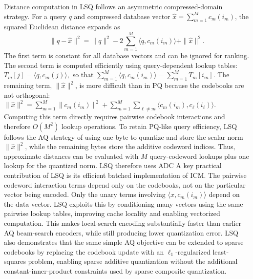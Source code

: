 \documentclass[sigconf]{acmart}
\begin{document}
Distance computation in LSQ follows an asymmetric compressed-domain strategy. 
For a query $q$ and compressed database vector $\hat{x}=\sum_{m=1}^{M}c_m(i_m)$, the squared Euclidean distance expands as
\[
\|q-\hat{x}\|^2
=
\|q\|^2
-
2\sum_{m=1}^{M}\langle q,c_m(i_m)\rangle
+
\|\hat{x}\|^2 .
\]
The first term is constant for all database vectors and can be ignored for ranking. 
The second term is computed efficiently using query-dependent lookup tables:
\(
T_m[j] = \langle q,c_m(j)\rangle ,
\)
so that
\(
\sum_{m=1}^{M}\langle q,c_m(i_m)\rangle
=
\sum_{m=1}^{M} T_m[i_m].
\)
The remaining term, $\|\hat{x}\|^2$, is more difficult than in PQ because the codebooks are not orthogonal:
\(
\|\hat{x}\|^2
=
\sum_{m=1}^{M}\|c_m(i_m)\|^2
+
\sum_{m=1}^{M}\sum_{\ell\neq m}
\langle c_m(i_m),c_\ell(i_\ell)\rangle .
\)
Computing this term directly requires pairwise codebook interactions and therefore $O(M^2)$ lookup operations. 
To retain PQ-like query efficiency, LSQ follows the AQ strategy of using one byte to quantize and store the scalar norm $\|\hat{x}\|^2$, while the remaining bytes store the additive codeword indices. 
Thus, approximate distances can be evaluated with $M$ query-codeword lookups plus one lookup for the quantized norm.
LSQ therefore uses ADC
A key practical contribution of LSQ is its efficient batched implementation of ICM. 
The pairwise codeword interaction terms depend only on the codebooks, not on the particular vector being encoded. 
Only the unary terms involving $\langle x,c_m(i_m)\rangle$ depend on the data vector. 
LSQ exploits this by conditioning many vectors using the same pairwise lookup tables, improving cache locality and enabling vectorized computation. 
This makes local-search encoding substantially faster than earlier AQ beam-search encoders, while still producing lower quantization error. 
LSQ also demonstrates that the same simple AQ objective can be extended to sparse codebooks by replacing the codebook update with an $\ell_1$-regularized least-squares problem, enabling sparse additive quantization without the additional constant-inner-product constraints used by sparse composite quantization.
\end{document}
